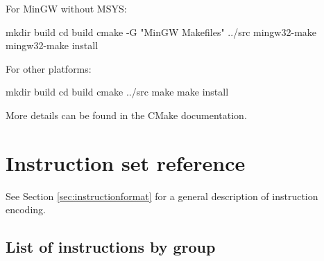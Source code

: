 \documentclass[a4paper,12pt,twoside,extrafontsizes]{memoir}
\begin{document}
For MinGW without MSYS:

\begin{codepar}
    mkdir build
    cd build
    cmake -G "MinGW Makefiles" ../src
    mingw32-make
    mingw32-make install
\end{codepar}

For other platforms:

\begin{codepar}
    mkdir build
    cd build
    cmake ../src
    make
    make install
\end{codepar}

More details can be found in the CMake documentation.

\appendix

\chapter{Instruction set reference}
\label{app:instructionset}

See Section \ref{sec:instructionformat} for a general description of \lxp{} instruction encoding.

\section{List of instructions by group}
\end{document}
